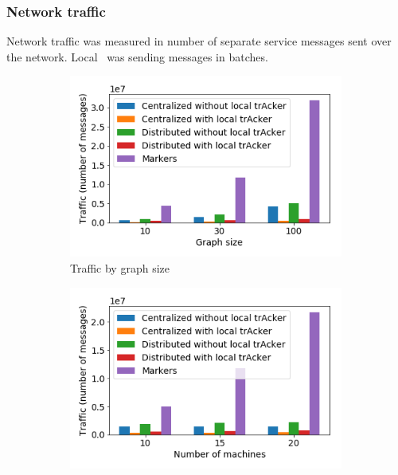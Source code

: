 \subsubsection{Network traffic}

Network traffic was measured in number of separate service messages sent over the network. Local \tracker\ was sending messages in batches.

\begin{figure}[t!]
    \begin{subfigure}[b]{0.32\textwidth}
            \includegraphics[width=0.99\textwidth]{pics/traffic_by_graph_size_bars.png}
            \caption{Traffic by graph size}
    \end{subfigure}
    \hspace{5mm}
    \begin{subfigure}[b]{0.32\textwidth}
            \includegraphics[width=0.99\textwidth]{pics/traffic_by_number_of_machines_bars.png}

\end{subfigure}
\end{figure}
